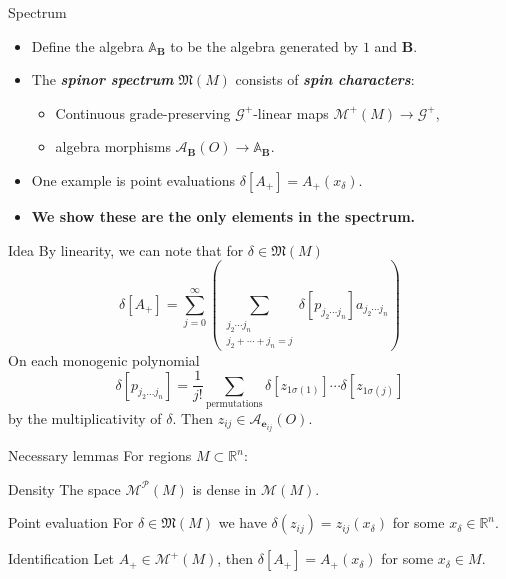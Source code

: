 \documentclass[aspectratio=169]{beamer}
\newcommand\boldgreen[1]{\textcolor{lighter_csu_green}{\emph{\textbf{#1}}}}
\newcommand\boldgold[1]{\textcolor{csu_gold}{\textbf{#1}}}
\newcommand{\R}{\mathbb{R}}
\newcommand{\algebra}{\mathcal{A}}
\newcommand{\G}{\mathcal{G}}
\newcommand{\characters}{\mathfrak{M}}
\newcommand{\monogenics}{\mathcal{M}}
\newcommand{\blade}[1]{\boldsymbol{#1}}
\newcommand{\bivector}{\blade{B}}
\begin{document}
\begin{frame}{Spectrum}
\vfill
\begin{itemize}
\pause
\item Define the algebra $\mathbb{A}_{\bivector}$ to be the algebra generated by $1$ and $\bivector$.
\pause
\item The \boldgreen{spinor spectrum} $\characters(M)$ consists of \boldgreen{spin characters}:
\begin{itemize}
  \item Continuous grade-preserving $\G^+$-linear maps $\monogenics^+(M) \to \G^+$,
  \item algebra morphisms $\algebra_{\bivector}(O) \to \mathbb{A}_{\bivector}$.
\end{itemize}
\pause
\item One example is point evaluations $\delta[A_+]=A_+(x_\delta)$.
\pause
\item \boldgold{We show these are the only elements in the spectrum.}
\end{itemize}
\vfill
\end{frame}

\begin{frame}{Idea}
\vfill
\pause By linearity, we can note that for $\delta \in \characters(M)$
\[
\delta[A_+] = \sum_{j=0}^\infty \left(\sum_{\substack{{j_2 \cdots j_n} \\ {j_2 + \cdots + j_n = j}}} \delta[p_{j_2 \cdots j_n}] a_{j_2 \cdots j_n} \right)
\]
\pause On each monogenic polynomial
\[
\delta[p_{j_2 \dots j_n}] = \frac{1}{j!} \sum_{\textrm{permutations}}\delta\left[z_{1\sigma(1)}\right] \cdots \delta\left[z_{1\sigma(j)}\right]
\]
by the multiplicativity of $\delta$. \pause Then $z_{ij} \in \algebra_{\blade{e}_{ij}}(O)$.
\vfill
\end{frame}


\begin{frame}{Necessary lemmas}
\vfill
\pause
For regions $M\subset \R^n$:
\pause
\begin{lemm*}{Density}{}
The space $\monogenics^\mathcal{P}(M)$ is dense in $\monogenics(M)$.
\end{lemm*}
\pause
\begin{lemm*}{Point evaluation}{}
For $\delta \in \characters(M)$ we have $\delta(z_{ij})=z_{ij}(x_\delta)$ for some $x_\delta \in \R^n$.
\end{lemm*}
\pause
\begin{lemm*}{Identification}{}
Let $A_+\in \mathcal{M}^+(M)$, then $\delta [A_+]=A_+(x_\delta)$ for some $x_\delta \in M$.
\end{lemm*}
\vfill
\end{frame}
\end{document}
